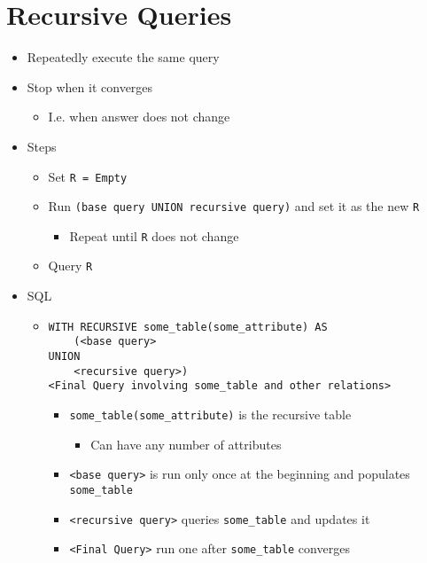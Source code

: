 
\section{Recursive Queries}
\begin{itemize}
    \item Repeatedly execute the same query
    \item Stop when it converges
        \begin{itemize}
            \item I.e. when answer does not change
        \end{itemize}
    \item Steps
        \begin{itemize}
            \item Set \verb+R = Empty+
            \item Run \verb+(base query UNION recursive query)+ and set it as the new \verb+R+
                \begin{itemize}
                    \item Repeat until \verb+R+ does not change
                \end{itemize}
            \item Query \verb+R+
        \end{itemize}
    \item SQL
        \begin{itemize}
            \item
\begin{verbatim}
WITH RECURSIVE some_table(some_attribute) AS
    (<base query>
UNION
    <recursive query>)
<Final Query involving some_table and other relations>
\end{verbatim}
                \begin{itemize}
                    \item \verb+some_table(some_attribute)+ is the recursive table
                        \begin{itemize}
                            \item Can have any number of attributes
                        \end{itemize}
                    \item \verb+<base query>+ is run only once at the beginning and populates \verb+some_table+
                    \item \verb+<recursive query>+ queries \verb+some_table+ and updates it
                    \item \verb+<Final Query>+ run one after \verb+some_table+ converges

\end{itemize}
\end{itemize}
\end{itemize}
